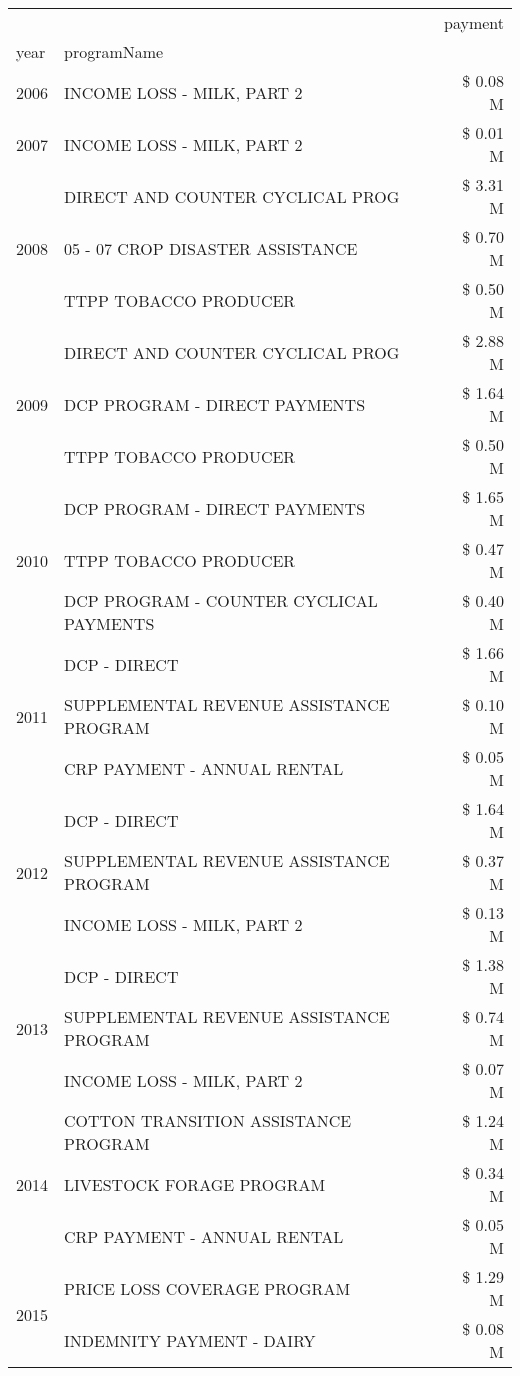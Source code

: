 \begin{tabular}{llr}
\toprule
 &  & payment \\
year & programName &  \\
\midrule
2006 & INCOME LOSS - MILK, PART 2 & \$ 0.08 M \\
\cline{1-3}
2007 & INCOME LOSS - MILK, PART 2 & \$ 0.01 M \\
\cline{1-3}
\multirow[t]{3}{*}{2008} & DIRECT AND COUNTER CYCLICAL PROG & \$ 3.31 M \\
 & 05 - 07 CROP DISASTER ASSISTANCE & \$ 0.70 M \\
 & TTPP TOBACCO PRODUCER & \$ 0.50 M \\
\cline{1-3}
\multirow[t]{3}{*}{2009} & DIRECT AND COUNTER CYCLICAL PROG & \$ 2.88 M \\
 & DCP PROGRAM - DIRECT PAYMENTS & \$ 1.64 M \\
 & TTPP TOBACCO PRODUCER & \$ 0.50 M \\
\cline{1-3}
\multirow[t]{3}{*}{2010} & DCP PROGRAM - DIRECT PAYMENTS & \$ 1.65 M \\
 & TTPP TOBACCO PRODUCER & \$ 0.47 M \\
 & DCP PROGRAM - COUNTER CYCLICAL PAYMENTS & \$ 0.40 M \\
\cline{1-3}
\multirow[t]{3}{*}{2011} & DCP - DIRECT & \$ 1.66 M \\
 & SUPPLEMENTAL REVENUE ASSISTANCE PROGRAM & \$ 0.10 M \\
 & CRP PAYMENT - ANNUAL RENTAL & \$ 0.05 M \\
\cline{1-3}
\multirow[t]{3}{*}{2012} & DCP - DIRECT & \$ 1.64 M \\
 & SUPPLEMENTAL REVENUE ASSISTANCE PROGRAM & \$ 0.37 M \\
 & INCOME LOSS - MILK, PART 2 & \$ 0.13 M \\
\cline{1-3}
\multirow[t]{3}{*}{2013} & DCP - DIRECT & \$ 1.38 M \\
 & SUPPLEMENTAL REVENUE ASSISTANCE PROGRAM & \$ 0.74 M \\
 & INCOME LOSS - MILK, PART 2 & \$ 0.07 M \\
\cline{1-3}
\multirow[t]{3}{*}{2014} & COTTON TRANSITION ASSISTANCE PROGRAM & \$ 1.24 M \\
 & LIVESTOCK FORAGE PROGRAM & \$ 0.34 M \\
 & CRP PAYMENT - ANNUAL RENTAL & \$ 0.05 M \\
\cline{1-3}
\multirow[t]{3}{*}{2015} & PRICE LOSS COVERAGE PROGRAM & \$ 1.29 M \\
 & INDEMNITY PAYMENT - DAIRY & \$ 0.08 M \\

\end{tabular}
